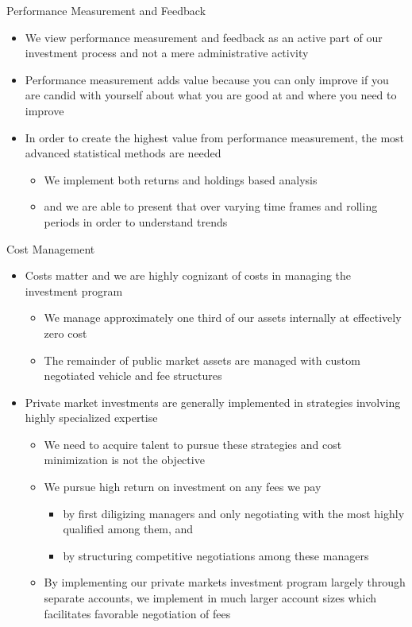 \documentclass[10pt,english]{beamer}\usepackage[]{graphicx}\usepackage[]{color}
\begin{document}
%
\begin{frame}{Performance Measurement and Feedback}
\begin{itemize}
\item We view performance measurement and feedback as an active part of
our investment process and not a mere administrative activity
\item Performance measurement adds value because you can only improve if
you are candid with yourself about what you are good at and where
you need to improve
\item In order to create the highest value from performance measurement,
the most advanced statistical methods are needed
\begin{itemize}
\item We implement both returns and holdings based analysis
\item and we are able to present that over varying time frames and rolling
periods in order to understand trends
\end{itemize}
\end{itemize}
\end{frame}
%
\begin{frame}{Cost Management}
\begin{itemize}
\item Costs matter and we are highly cognizant of costs in managing the
investment program
\begin{itemize}
\item We manage approximately one third of our assets internally at effectively
zero cost
\item The remainder of public market assets are managed with custom negotiated
vehicle and fee structures
\end{itemize}
\item Private market investments are generally implemented in strategies
involving highly specialized expertise 
\begin{itemize}
\item We need to acquire talent to pursue these strategies and cost minimization
is not the objective
\item We pursue high return on investment on any fees we pay
\begin{itemize}
\item by first diligizing managers and only negotiating with the most highly
qualified among them, and 
\item by structuring competitive negotiations among these managers
\end{itemize}
\item By implementing our private markets investment program largely through
separate accounts, we implement in much larger account sizes which
facilitates favorable negotiation of fees
\end{itemize}
\end{itemize}
\end{frame}
%
\end{document}
